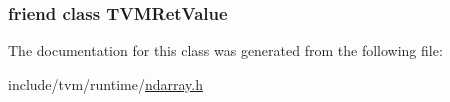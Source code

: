 \subsubsection[{\texorpdfstring{T\+V\+M\+Ret\+Value}{TVMRetValue}}]{\setlength{\rightskip}{0pt plus 5cm}friend class {\bf T\+V\+M\+Ret\+Value}\hspace{0.3cm}{\ttfamily [friend]}}\hypertarget{classtvm_1_1runtime_1_1NDArray_ae0ea8b4adc6dab8c74086bceaef6b3e1}{}\label{classtvm_1_1runtime_1_1NDArray_ae0ea8b4adc6dab8c74086bceaef6b3e1}


The documentation for this class was generated from the following file\+:\begin{DoxyCompactItemize}
\item 
include/tvm/runtime/\hyperlink{ndarray_8h}{ndarray.\+h}\end{DoxyCompactItemize}
